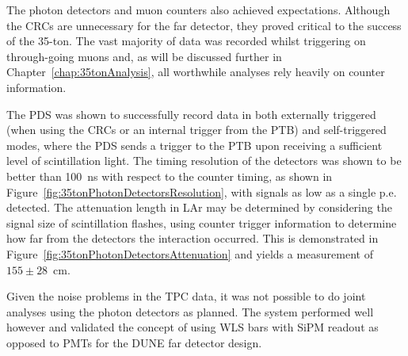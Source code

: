 The photon detectors and muon counters also achieved expectations.  Although the CRCs are unnecessary for the far detector, they proved critical to the success of the 35-ton.  The vast majority of data was recorded whilst triggering on through-going muons and, as will be discussed further in Chapter~\ref{chap:35tonAnalysis}, all worthwhile analyses rely heavily on counter information.

The PDS was shown to successfully record data in both externally triggered (when using the CRCs or an internal trigger from the PTB) and self-triggered modes, where the PDS sends a trigger to the PTB upon receiving a sufficient level of scintillation light.  The timing resolution of the detectors was shown to be better than 100~ns with respect to the counter timing, as shown in Figure~\ref{fig:35tonPhotonDetectorsResolution}, with signals as low as a single p.e. detected.  The attenuation length in LAr may be determined by considering the signal size of scintillation flashes, using counter trigger information to determine how far from the detectors the interaction occurred.  This is demonstrated in Figure~\ref{fig:35tonPhotonDetectorsAttenuation} and yields a measurement of $155\pm28$~cm.

Given the noise problems in the TPC data, it was not possible to do joint analyses using the photon detectors as planned.  The system performed well however and validated the concept of using WLS bars with SiPM readout as opposed to PMTs for the DUNE far detector design.

